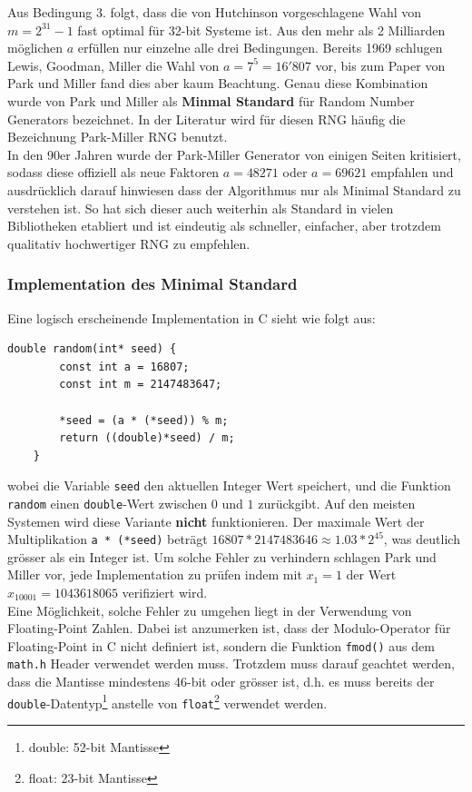 \documentclass{book}
\begin{document}
\begin{refsection}
Aus Bedingung 3. folgt, dass die von Hutchinson \cite{rng:Hutchinson1966} vorgeschlagene Wahl von $m = 2^{31} - 1$ fast optimal für 32-bit Systeme ist. Aus den mehr als 2 Milliarden möglichen $a$ erfüllen nur einzelne alle drei Bedingungen. Bereits 1969 schlugen Lewis, Goodman, Miller \cite{rng:LewisGoodmanMiller1969} die Wahl von $a = 7^5 = 16'807$ vor, bis zum Paper von Park und Miller fand dies aber kaum Beachtung. Genau diese Kombination wurde von Park und Miller als \textbf{Minmal Standard}  für Random Number Generators bezeichnet. In der Literatur wird für diesen RNG häufig die Bezeichnung Park-Miller RNG benutzt. \\

In den 90er Jahren wurde der Park-Miller Generator von einigen Seiten kritisiert, sodass diese offiziell als neue Faktoren $a = 48271$ oder $a = 69621$ empfahlen und ausdrücklich darauf hinwiesen dass der Algorithmus nur als Minimal Standard zu verstehen ist. So hat sich dieser auch weiterhin als Standard in vielen Bibliotheken etabliert und ist eindeutig als schneller, einfacher, aber trotzdem qualitativ hochwertiger RNG zu empfehlen.

\newpage
\subsubsection{Implementation des Minimal Standard}
Eine logisch erscheinende Implementation in C sieht wie folgt aus:
\begin{lstlisting}[style=C]
	double random(int* seed) {
		const int a = 16807;
		const int m = 2147483647;
		
		*seed = (a * (*seed)) % m;
		return ((double)*seed) / m;
	}
\end{lstlisting}
wobei die Variable \texttt{seed} den aktuellen Integer Wert speichert, und die Funktion \texttt{random} einen \texttt{double}-Wert zwischen $0$ und $1$ zurückgibt. Auf den meisten Systemen wird diese Variante \textbf{nicht} funktionieren. Der maximale Wert der Multiplikation \texttt{a * (*seed)} beträgt $16807*2147483646 \approx 1.03 * 2^{45}$, was deutlich grösser als ein Integer ist. Um solche Fehler zu verhindern schlagen Park und Miller vor, jede Implementation zu prüfen indem mit $x_1 = 1$ der Wert $x_{10001} = 1043618065$ verifiziert wird. \\

Eine Möglichkeit, solche Fehler zu umgehen liegt in der Verwendung von Floating-Point Zahlen. Dabei ist anzumerken ist, dass der Modulo-Operator für Floating-Point in C nicht definiert ist, sondern die Funktion \texttt{fmod()} aus dem \texttt{math.h} Header verwendet werden muss. Trotzdem muss darauf geachtet werden, dass die Mantisse mindestens 46-bit oder grösser ist, d.h. es muss bereits der \texttt{double}-Datentyp\footnote{double: 52-bit Mantisse} anstelle von \texttt{float}\footnote{float: 23-bit Mantisse} verwendet werden. \\


\end{refsection}
\end{document}
